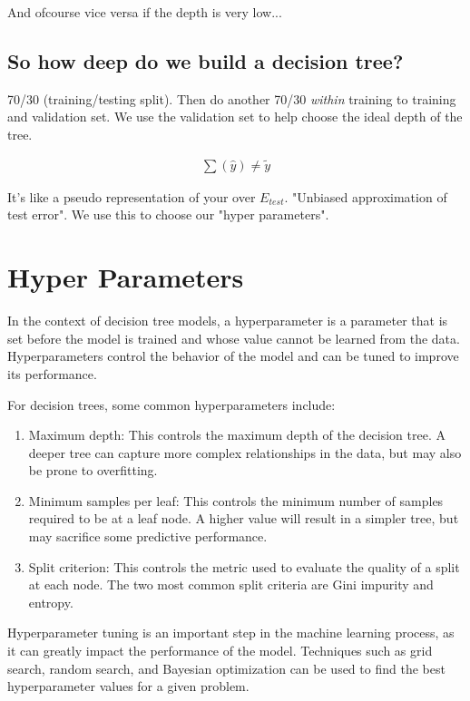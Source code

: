 \documentclass{article}
\begin{document}
And ofcourse vice versa if the depth is very low...

\subsection*{So how deep do we build a decision tree?}
70/30 (training/testing split). Then do another 70/30 {\em within} training to training and validation set. We use the validation set to help choose the ideal depth of the tree.

\begin{align*}
	\sum (\hat y) \not = \widetilde{y}
\end{align*}

It's like a pseudo representation of your over $E_{test}$. "Unbiased approximation of test error". We use this to choose our "hyper parameters".

\section{Hyper Parameters}
In the context of decision tree models, a hyperparameter is a parameter that is set before the model is trained and whose value cannot be learned from the data. Hyperparameters control the behavior of the model and can be tuned to improve its performance.

For decision trees, some common hyperparameters include:

\begin{enumerate}
	\item Maximum depth: This controls the maximum depth of the decision tree. A deeper tree can capture more complex relationships in the data, but may also be prone to overfitting.

	\item Minimum samples per leaf: This controls the minimum number of samples required to be at a leaf node. A higher value will result in a simpler tree, but may sacrifice some predictive performance.

	\item Split criterion: This controls the metric used to evaluate the quality of a split at each node. The two most common split criteria are Gini impurity and entropy.

\end{enumerate}

Hyperparameter tuning is an important step in the machine learning process, as it can greatly impact the performance of the model. Techniques such as grid search, random search, and Bayesian optimization can be used to find the best hyperparameter values for a given problem.
\end{document}
